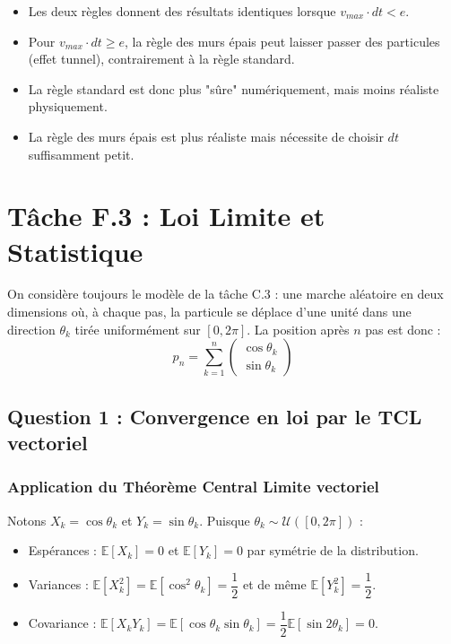 \documentclass[12pt,a4paper]{report}
\begin{document}
\begin{itemize}
    \item Les deux règles donnent des résultats identiques lorsque $v_{max} \cdot dt < e$.
    \item Pour $v_{max} \cdot dt \geq e$, la règle des murs épais peut laisser passer des particules (effet tunnel), contrairement à la règle standard.
    \item La règle standard est donc plus "sûre" numériquement, mais moins réaliste physiquement.
    \item La règle des murs épais est plus réaliste mais nécessite de choisir $dt$ suffisamment petit.
\end{itemize}

\section{Tâche F.3 : Loi Limite et Statistique}

On considère toujours le modèle de la tâche C.3 : une marche aléatoire en deux dimensions
où, à chaque pas, la particule se déplace d'une unité dans une direction $\theta_k$ tirée
uniformément sur $[0, 2\pi]$. La position après $n$ pas est donc :
\[
    p_n = \sum_{k=1}^{n} \begin{pmatrix} \cos\theta_k \\ \sin\theta_k \end{pmatrix}
\]

\subsection{Question 1 : Convergence en loi par le TCL vectoriel}

\subsubsection{Application du Théorème Central Limite vectoriel}

Notons $X_k = \cos\theta_k$ et $Y_k = \sin\theta_k$. Puisque $\theta_k \sim \mathcal{U}([0, 2\pi])$ :

\begin{itemize}
    \item Espérances : $\mathbb{E}[X_k] = 0$ et $\mathbb{E}[Y_k] = 0$ par symétrie de la distribution.
    \item Variances : $\mathbb{E}[X_k^2] = \mathbb{E}[\cos^2\theta_k] = \dfrac{1}{2}$ et de même $\mathbb{E}[Y_k^2] = \dfrac{1}{2}$.
    \item Covariance : $\mathbb{E}[X_k Y_k] = \mathbb{E}[\cos\theta_k \sin\theta_k] = \dfrac{1}{2}\mathbb{E}[\sin 2\theta_k] = 0$.
\end{itemize}
\end{document}
